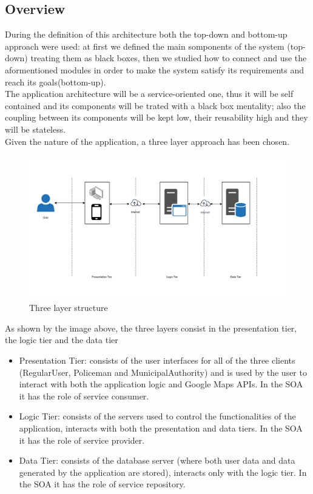 \subsection{Overview}
During the definition of this architecture both the top-down and bottom-up approach were used: at first we defined the main somponents of the system (top-down) treating them as black boxes, then we studied how to connect and use the aformentioned modules in order to make the system satisfy its requirements and reach its goals(bottom-up).\\
The application architecture will be a service-oriented one, thus it will be self contained and its components will be trated with a black box mentality; also the coupling between its components will be kept low, their reusability high and they will be stateless.\\
Given the nature of the application, a three layer approach has been chosen.\newline
\begin{figure}[h!]
	\centering
	\includegraphics[width=\textwidth]{Images/three_layer}
	\caption{Three layer structure}
\end{figure}
\newline
As shown by the image above, the three layers consist in the presentation tier, the logic tier and the data tier
\begin{itemize}
\item Presentation Tier: consists of the user interfaces for all of the three clients (RegularUser, Policeman and MunicipalAuthority) and is used by the user to interact with both the application logic and Google Maps APIs. In the SOA it has the role of service consumer. \newline
\item Logic Tier: consists of the servers used to control the functionalities of the application, interacts with both the presentation and data tiers. In the SOA it has the role of service provider. \newline
\item Data Tier: consists of the database server (where both user data and data generated by the application are stored), interacts only with the logic tier. In the SOA it has the role of service repository. \newline
\end{itemize}
\newpage
